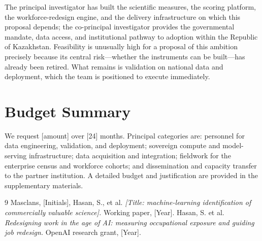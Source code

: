 \documentclass[11pt]{article}
\begin{document}
The principal investigator has built the scientific measures, the scoring
platform, the workforce-redesign engine, and the delivery infrastructure on which
this proposal depends; the co-principal investigator provides the governmental
mandate, data access, and institutional pathway to adoption within the Republic of
Kazakhstan. Feasibility is unusually high for a proposal of this ambition
precisely because its central risk---whether the instruments can be built---has
already been retired. What remains is validation on national data and deployment,
which the team is positioned to execute immediately.

\section{Budget Summary}

We request [amount] over [24] months. Principal categories are: personnel for
data engineering, validation, and deployment; sovereign compute and model-serving
infrastructure; data acquisition and integration; fieldwork for the enterprise
census and workforce cohorts; and dissemination and capacity transfer to the
partner institution. A detailed budget and justification are provided in the
supplementary materials.



\begin{thebibliography}{9}
 Masclans, [Initials], Hasan, S., et al.
  \emph{[Title: machine-learning identification of commercially valuable
  science].} Working paper, [Year]. %
 Hasan, S. et al. \emph{Redesigning work in the age of AI:
  measuring occupational exposure and guiding job redesign.} OpenAI research
  grant, [Year].
\end{thebibliography}
\end{document}
